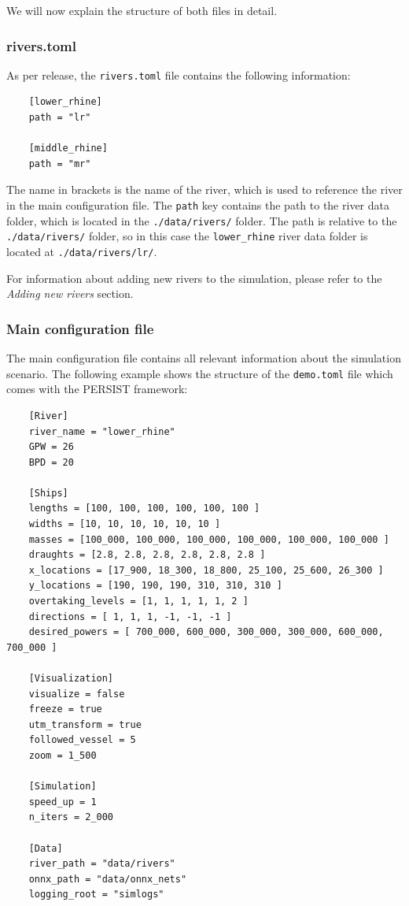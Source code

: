 \documentclass[
	a4paper, %
	12pt, %
]{persist}
\begin{document}
We will now explain the structure of both files in detail.

\subsubsection{rivers.toml}

As per release, the \verb|rivers.toml| file contains the following information:
\begin{lstlisting}
	[lower_rhine]
	path = "lr"

	[middle_rhine]
	path = "mr"
\end{lstlisting}

The name in brackets is the name of the river, which is used to reference the river in the main configuration file. The \verb|path| key contains the path to the river data folder, which is located in the \verb|./data/rivers/| folder. The path is relative to the \verb|./data/rivers/| folder, so in this case the \verb|lower_rhine| river data folder is located at \verb|./data/rivers/lr/|.

For information about adding new rivers to the simulation, please refer to the \emph{Adding new rivers} section.

\subsubsection{Main configuration file}

The main configuration file contains all relevant information about the simulation scenario. The following example shows the structure of the \verb|demo.toml| file which comes with the PERSIST framework:

\begin{lstlisting}
	[River]
	river_name = "lower_rhine"
	GPW = 26
	BPD = 20

	[Ships]
	lengths = [100, 100, 100, 100, 100, 100 ]
	widths = [10, 10, 10, 10, 10, 10 ]
	masses = [100_000, 100_000, 100_000, 100_000, 100_000, 100_000 ]
	draughts = [2.8, 2.8, 2.8, 2.8, 2.8, 2.8 ]
	x_locations = [17_900, 18_300, 18_800, 25_100, 25_600, 26_300 ]
	y_locations = [190, 190, 190, 310, 310, 310 ]
	overtaking_levels = [1, 1, 1, 1, 1, 2 ]
	directions = [ 1, 1, 1, -1, -1, -1 ]
	desired_powers = [ 700_000, 600_000, 300_000, 300_000, 600_000, 700_000 ]

	[Visualization]
	visualize = false
	freeze = true
	utm_transform = true
	followed_vessel = 5
	zoom = 1_500

	[Simulation]
	speed_up = 1
	n_iters = 2_000

	[Data]
	river_path = "data/rivers"
	onnx_path = "data/onnx_nets"
	logging_root = "simlogs"
\end{lstlisting}
\end{document}

